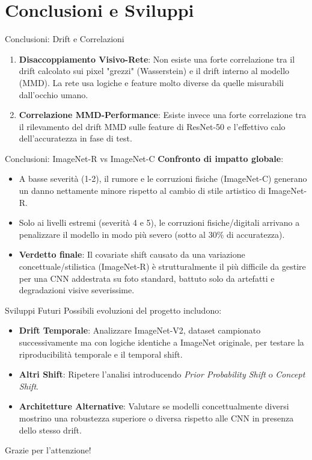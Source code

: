 \documentclass[aspectratio=169]{beamer}
\begin{document}
\section{Conclusioni e Sviluppi}

\begin{frame}{Conclusioni: Drift e Correlazioni}
    \begin{enumerate}
        \item \textbf{Disaccoppiamento Visivo-Rete}: Non esiste una forte correlazione tra il drift calcolato sui pixel "grezzi" (Wasserstein) e il drift interno al modello (MMD). La rete usa logiche e feature molto diverse da quelle misurabili dall'occhio umano.
        \item \textbf{Correlazione MMD-Performance}: Esiste invece una forte correlazione tra il rilevamento del drift MMD sulle feature di ResNet-50 e l'effettivo calo dell'accuratezza in fase di test.
    \end{enumerate}
\end{frame}

\begin{frame}{Conclusioni: ImageNet-R vs ImageNet-C}
    \textbf{Confronto di impatto globale}:
    \begin{itemize}
        \item A basse severità (1-2), il rumore e le corruzioni fisiche (ImageNet-C) generano un danno nettamente minore rispetto al cambio di stile artistico di ImageNet-R.
        \item Solo ai livelli estremi (severità 4 e 5), le corruzioni fisiche/digitali arrivano a penalizzare il modello in modo più severo (sotto al 30\% di accuratezza).
        \item \textbf{Verdetto finale}: Il covariate shift causato da una variazione concettuale/stilistica (ImageNet-R) è strutturalmente il più difficile da gestire per una CNN addestrata su foto standard, battuto solo da artefatti e degradazioni visive severissime.
    \end{itemize}
\end{frame}

\begin{frame}{Sviluppi Futuri}
    Possibili evoluzioni del progetto includono:
    \begin{itemize}
        \item \textbf{Drift Temporale}: Analizzare ImageNet-V2, dataset campionato successivamente ma con logiche identiche a ImageNet originale, per testare la riproducibilità temporale e il temporal shift.
        \item \textbf{Altri Shift}: Ripetere l'analisi introducendo \textit{Prior Probability Shift} o \textit{Concept Shift}.
        \item \textbf{Architetture Alternative}: Valutare se modelli concettualmente diversi mostrino una robustezza superiore o diversa rispetto alle CNN in presenza dello stesso drift.
    \end{itemize}
\end{frame}

\begin{frame}
    \centering
    \Huge
    Grazie per l'attenzione!
\end{frame}
\end{document}
